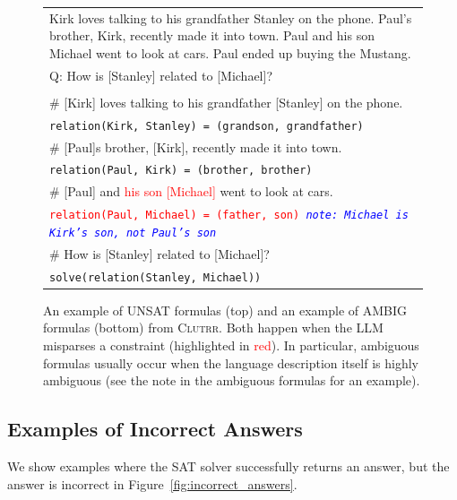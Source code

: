\documentclass{article}
\theoremstyle{definition}
\newcommand{\clutrr}{\textsc{Clutrr}}
\begin{document}
\begin{figure}[h]
\begin{tabularx}{\linewidth}{X}
    Kirk loves talking to his grandfather Stanley on the phone. Paul's brother, Kirk, recently made it into town. Paul and his son Michael went to look at cars. Paul ended up buying the Mustang. \\
Q: How is [Stanley] related to [Michael]? \\
\\
   \# [Kirk] loves talking to his grandfather [Stanley] on the phone. \\
   \tt relation(Kirk, Stanley) = (grandson, grandfather) \\
    \# [Paul]s brother, [Kirk], recently made it into town. \\
   \tt relation(Paul, Kirk) = (brother, brother) \\
    \# [Paul] and \textcolor{red}{his son [Michael]}  went to look at cars. \\
   \tt \textcolor{red}{relation(Paul, Michael) = (father, son)} \tt \textcolor{blue}{\it note: Michael is Kirk's son, not Paul's son} \\
    \# How is [Stanley] related to [Michael]? \\
   \tt solve(relation(Stanley, Michael)) \\
    \bottomrule
    \end{tabularx}
    \caption{An example of UNSAT formulas (top) and an example of AMBIG formulas (bottom) from \clutrr{}. Both happen when the LLM misparses a constraint (highlighted in \textcolor{red}{red}). In particular, ambiguous formulas usually occur when the language description itself is highly ambiguous (see the note in the ambiguous formulas for an example). }
    \label{fig:unsat_ambig_clutrr}
\end{figure}

\newpage
\subsection{Examples of Incorrect Answers}

We show examples where the SAT solver successfully returns an answer, but the answer is incorrect in Figure~\ref{fig:incorrect_answers}.
\end{document}
